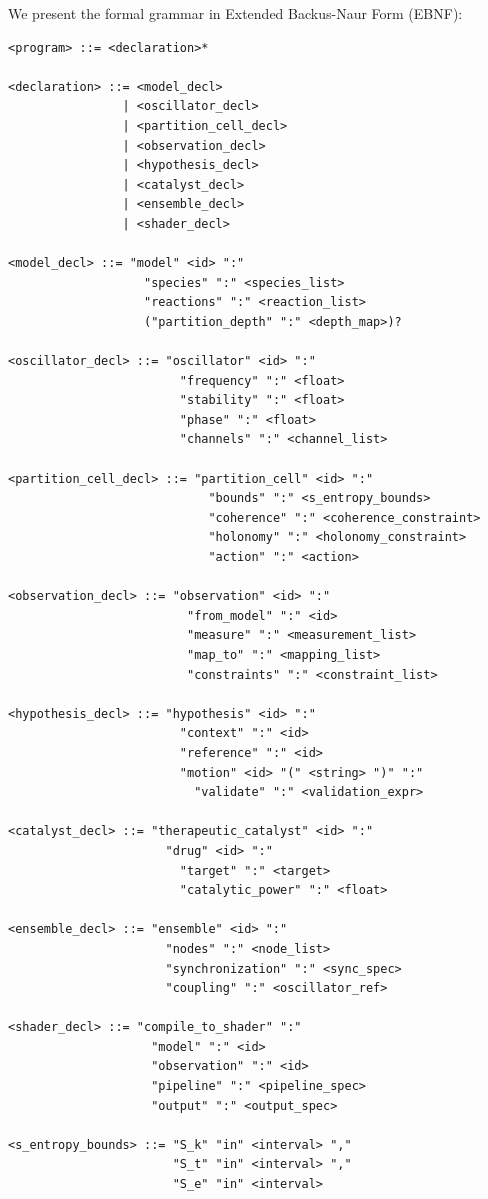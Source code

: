 \documentclass[12pt,a4paper]{article}
\begin{document}
We present the formal grammar in Extended Backus-Naur Form (EBNF):

\begin{lstlisting}[basicstyle=\ttfamily\small]
<program> ::= <declaration>*

<declaration> ::= <model_decl>
                | <oscillator_decl>
                | <partition_cell_decl>
                | <observation_decl>
                | <hypothesis_decl>
                | <catalyst_decl>
                | <ensemble_decl>
                | <shader_decl>

<model_decl> ::= "model" <id> ":"
                   "species" ":" <species_list>
                   "reactions" ":" <reaction_list>
                   ("partition_depth" ":" <depth_map>)?

<oscillator_decl> ::= "oscillator" <id> ":"
                        "frequency" ":" <float>
                        "stability" ":" <float>
                        "phase" ":" <float>
                        "channels" ":" <channel_list>

<partition_cell_decl> ::= "partition_cell" <id> ":"
                            "bounds" ":" <s_entropy_bounds>
                            "coherence" ":" <coherence_constraint>
                            "holonomy" ":" <holonomy_constraint>
                            "action" ":" <action>

<observation_decl> ::= "observation" <id> ":"
                         "from_model" ":" <id>
                         "measure" ":" <measurement_list>
                         "map_to" ":" <mapping_list>
                         "constraints" ":" <constraint_list>

<hypothesis_decl> ::= "hypothesis" <id> ":"
                        "context" ":" <id>
                        "reference" ":" <id>
                        "motion" <id> "(" <string> ")" ":"
                          "validate" ":" <validation_expr>

<catalyst_decl> ::= "therapeutic_catalyst" <id> ":"
                      "drug" <id> ":"
                        "target" ":" <target>
                        "catalytic_power" ":" <float>

<ensemble_decl> ::= "ensemble" <id> ":"
                      "nodes" ":" <node_list>
                      "synchronization" ":" <sync_spec>
                      "coupling" ":" <oscillator_ref>

<shader_decl> ::= "compile_to_shader" ":"
                    "model" ":" <id>
                    "observation" ":" <id>
                    "pipeline" ":" <pipeline_spec>
                    "output" ":" <output_spec>

<s_entropy_bounds> ::= "S_k" "in" <interval> ","
                       "S_t" "in" <interval> ","
                       "S_e" "in" <interval>
\end{lstlisting}
\end{document}
